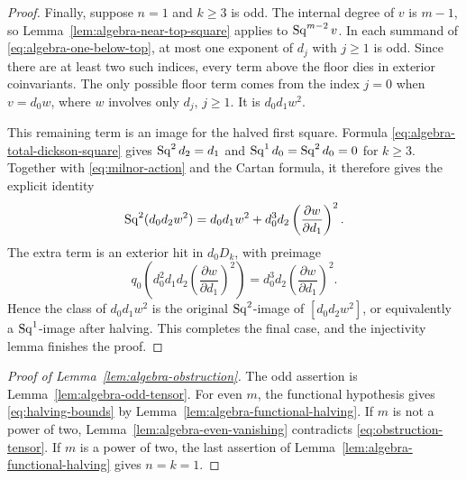 \begin{proof}
Finally, suppose $n=1$ and $k\geq3$ is odd.  The internal degree of
$v$ is $m-1$, so Lemma~\ref{lem:algebra-near-top-square} applies to
$\operatorname{Sq}^{m-2}v$.  In each summand of
\eqref{eq:algebra-one-below-top}, at most one exponent of
$d_j$ with $j\geq1$ is odd.  Since there are at least two such
indices, every term above the floor dies in exterior coinvariants.
The only possible floor term comes from the index $j=0$ when
$v=d_0w$, where $w$ involves only $d_j$, $j\geq1$.  It is
$d_0d_1w^2$.

This remaining term is an image for the halved first square.  Formula
\eqref{eq:algebra-total-dickson-square} gives
$\operatorname{Sq}^2d_2=d_1$ and $\operatorname{Sq}^1d_0=\operatorname{Sq}^2d_0=0$ for $k\geq3$.
Together with \eqref{eq:milnor-action} and the Cartan formula, it
therefore gives the explicit identity
\begin{equation}\label{eq:algebra-floor-witness}
 \operatorname{Sq}^2(d_0d_2w^2)
 =d_0d_1w^2+
   d_0^3d_2\left(\frac{\partial w}{\partial d_1}\right)^2.
\end{equation}
The extra term is an exterior hit in $d_0D_k$, with preimage
\[
 q_0\left(
 d_0^2d_1d_2\left(\frac{\partial w}{\partial d_1}\right)^2
 \right)
 =d_0^3d_2\left(\frac{\partial w}{\partial d_1}\right)^2.
\]
Hence the class of $d_0d_1w^2$ is the original $\operatorname{Sq}^2$-image of
$[d_0d_2w^2]$, or equivalently a $\operatorname{Sq}^1$-image after halving.
This completes the final case, and the injectivity lemma finishes
the proof.
\end{proof}

\begin{proof}[Proof of Lemma~\ref{lem:algebra-obstruction}]
The odd assertion is Lemma~\ref{lem:algebra-odd-tensor}.
For even $m$, the functional hypothesis gives
\eqref{eq:halving-bounds} by
Lemma~\ref{lem:algebra-functional-halving}.  If $m$ is not a power
of two, Lemma~\ref{lem:algebra-even-vanishing} contradicts
\eqref{eq:obstruction-tensor}.  If $m$ is a power of two, the last
assertion of Lemma~\ref{lem:algebra-functional-halving} gives
$n=k=1$.
\end{proof}

